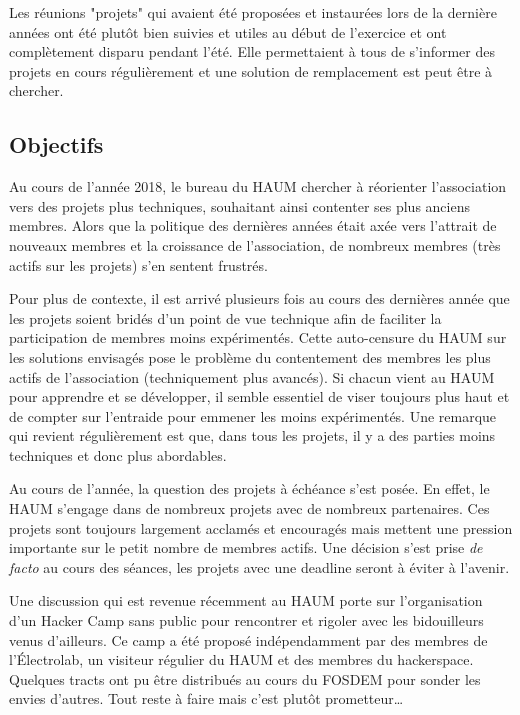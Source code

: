 \documentclass[11pt]{article}
\begin{document}
Les réunions "projets" qui avaient été proposées et instaurées lors de la dernière années
ont été plutôt bien suivies et utiles au début de l'exercice et ont complètement disparu
pendant l'été. Elle permettaient à tous de s'informer des projets en cours régulièrement
et une solution de remplacement est peut être à chercher.

\subsection{Objectifs}

Au cours de l'année 2018, le bureau du HAUM chercher à réorienter l'association vers des
projets plus techniques, souhaitant ainsi contenter ses plus anciens membres. Alors que la
politique des dernières années était axée vers l'attrait de nouveaux membres et la
croissance de l'association, de nombreux membres (très actifs sur les projets) s'en
sentent frustrés.

Pour plus de contexte, il est arrivé plusieurs fois au cours des dernières année que les
projets soient bridés d'un point de vue technique afin de faciliter la participation de
membres moins expérimentés. Cette auto-censure du HAUM sur les solutions envisagés pose
le problème du contentement des membres les plus actifs de l'association (techniquement
plus avancés). Si chacun vient au HAUM pour apprendre et se développer, il semble
essentiel de viser toujours plus haut et de compter sur l'entraide pour emmener les moins
expérimentés. Une remarque qui revient régulièrement est que, dans tous les projets, il y
a des parties moins techniques et donc plus abordables.

Au cours de l'année, la question des projets à échéance s'est posée. En effet, le HAUM
s'engage dans de nombreux projets avec de nombreux partenaires. Ces projets sont toujours
largement acclamés et encouragés mais mettent une pression importante sur le petit nombre
de membres actifs. Une décision s'est prise \textit{de facto} au cours des séances, les
projets avec une deadline seront à éviter à l'avenir.

Une discussion qui est revenue récemment au HAUM porte sur l'organisation d'un Hacker Camp
sans public pour rencontrer et rigoler avec les bidouilleurs venus d'ailleurs. Ce camp a
été proposé indépendamment par des membres de l'Électrolab, un visiteur régulier du HAUM
et des membres du hackerspace. Quelques tracts ont pu être distribués au cours du FOSDEM
pour sonder les envies d'autres. Tout reste à faire mais c'est plutôt prometteur\ldots
\end{document}
